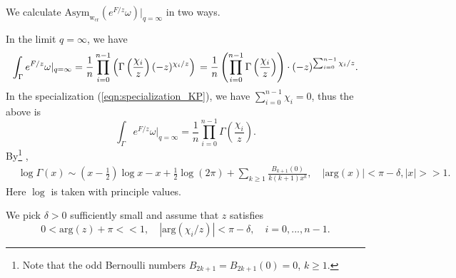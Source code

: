 \documentclass[12pt]{amsart}
\numberwithin{equation}{section}
\begin{document}
We calculate $\text{Asym}_{\mathrm{w}_{\text{cr}}}(e^{F/z}\omega)|_{q=\infty}$ in two ways.

In the limit $q=\infty$, we have
\begin{equation*}
\int_\Gamma e^{F/z}\omega|_{q=\infty}=\frac{1}{n}\prod_{i=0}^{n-1}\left(\Gamma\left(\frac{\chi_i}{z}\right)(-z)^{\chi_i/z}\right)\\
=\frac{1}{n}\left(\prod_{i=0}^{n-1}\Gamma\left(\frac{\chi_i}{z}\right)\right)\cdot (-z)^{\sum_{i=0}^{n-1}\chi_i/z}.
\end{equation*}
In the specialization (\ref{eqn:specialization_KP}), we have $\sum_{i=0}^{n-1}\chi_i=0$, thus the above is
\begin{equation*}
\int_\Gamma e^{F/z}\omega|_{q=\infty}=\frac{1}{n}\prod_{i=0}^{n-1}\Gamma\left(\frac{\chi_i}{z}\right).
\end{equation*}
By\footnote{Note that the odd Bernoulli numbers $B_{2k+1}=B_{2k+1}(0)=0$, $k\geq 1$.} \cite[5.11.1]{dlmf}, 
\begin{equation*}
\begin{split}
&\log\Gamma(x)\sim \left(x-\frac{1}{2}\right)\log x -x +\frac{1}{2}\log (2\pi)+ \sum_{k\geq 1}\frac{B_{k+1}(0)}{k(k+1)x^k}, \quad |\text{arg}(x)|<\pi-\delta, |x|>>1.
\end{split}
\end{equation*}
Here $\log$ is taken with principle values.

We pick $\delta>0$ sufficiently small and assume that $z$ satisfies
\begin{equation*}
0<\text{arg}(z)+\pi<<1, \quad |\text{arg}(\chi_i/z)|<\pi-\delta,\quad i=0,...,n-1.    
\end{equation*}
\end{document}
